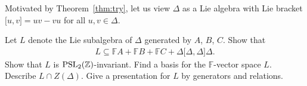\documentclass[pdftex]{sigma}
\numberwithin{equation}{section}
\begin{document}
Motivated by Theorem~\ref{thm:try}, let us view
$\Delta$ as a Lie algebra with
Lie bracket $\lbrack u,v\rbrack = uv-vu$ for
all $u,v \in \Delta$.


\begin{Problem}
Let $L$ denote the Lie subalgebra of $\Delta$
generated by $A$, $B$, $C$. Show that
\begin{gather*}
L \subseteq \mathbb F A + \mathbb F B + \mathbb F C +
\Delta\lbrack \Delta,\Delta\rbrack \Delta.
\end{gather*}
Show that $L$ is
${\rm  {PSL}}_2(\mathbb Z)$-invariant.
Find a basis for the
$\mathbb F$-vector space $L$. Describe
$L\cap Z(\Delta)$. Give a presentation for $L$
by generators and relations.
\end{Problem}



\end{document}
